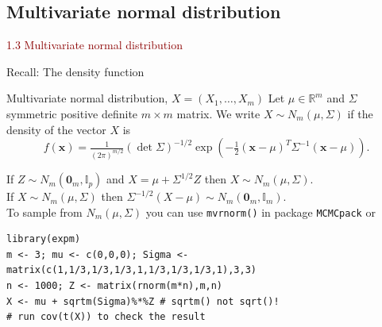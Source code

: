 \documentclass[dvipsnames,aspectratio=169]{beamer} %
\newcommand{\R}{\mathbb{R}}
\newcommand{\bs}{\boldsymbol}
\begin{document}
\subsection{Multivariate normal distribution}
\begin{frame}{}
\begin{center}
	{\huge \textcolor{DarkRed}{1.3 Multivariate normal distribution}}
\end{center}
\end{frame}

\begin{frame}[fragile]{Recall: The density function}
\begin{alertblock}{Multivariate normal distribution, $X=(X_1,\ldots,X_m)$}
Let $\mu\in \R^m$ and $\Sigma$ symmetric positive definite $m\times m$ matrix. We write $X\sim N_m(\mu,\Sigma)$ if the density of the vector $X$ is
$$
f(\bs x)=\tfrac{1}{(2\pi)^{m/2}}(\det \Sigma)^{-1/2}\exp\left(-\tfrac{1}{2}(\bs x-\mu)^T \Sigma^{-1}(\bs x-\mu)\right).
$$
\end{alertblock}

If $Z\sim N_m(\bs 0_m,\mathbb I_p)$ and \;$X=\mu+\Sigma^{1/2}Z$\; then $X\sim N_m(\mu,\Sigma)$.\\
If $X\sim N_m(\mu,\Sigma)$ then $\Sigma^{-1/2}(X-\mu)\sim N_m(\bs 0_m, \mathbb I_m)$.\\[.2cm]
To sample from $N_m(\mu,\Sigma)$ you can use \texttt{mvrnorm()} in package \texttt{MCMCpack} or 
\begin{lstlisting}
library(expm)
m <- 3; mu <- c(0,0,0); Sigma <- matrix(c(1,1/3,1/3,1/3,1,1/3,1/3,1/3,1),3,3)
n <- 1000; Z <- matrix(rnorm(m*n),m,n)
X <- mu + sqrtm(Sigma)%*%Z # sqrtm() not sqrt()!
# run cov(t(X)) to check the result
\end{lstlisting}
\end{frame}
\end{document}
